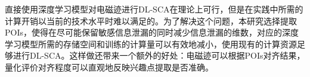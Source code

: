 {	直接使用深度学习模型对电磁迹进行DL-SCA在理论上可行，但是在实践中所需的计算开销以当前的技术水平时难以满足的。为了解决这个问题，本研究选择提取POIs，使得在尽可能保留敏感信息泄漏的同时减少信息泄漏的维数，对应的深度学习模型所需的存储空间和训练的计算量可以有效地减小，使用现有的计算资源足够进行DL-SCA。这样做还带来一个额外的好处：电磁迹可以根据POIs对齐结果，量化评价对齐程度可以直观地反映兴趣点提取是否准确。
	
	
%	
%	
%	
%	
%	
%		
%	
	
}
